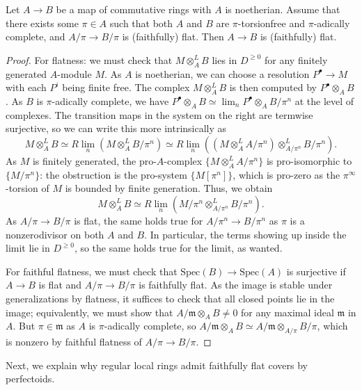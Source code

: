 \documentclass[10pt,reqno]{amsart}
\begin{document}
\begin{proposition}
\label{prop:FaithfulFlatnessNoetherian}
Let $A \to B$ be a map of commutative rings with $A$ is noetherian. Assume that there exists some  $\pi \in A$ such that both $A$ and $B$ are $\pi$-torsionfree and $\pi$-adically complete, and $A/\pi \to B/\pi$ is (faithfully) flat. Then $A \to B$ is (faithfully) flat.
\end{proposition}
\begin{proof}
For flatness: we must check that $M \otimes_A^L B$ lies in $D^{\geq 0}$ for any finitely generated $A$-module $M$. As $A$ is noetherian, we can choose a resolution $P^\bullet \to M$ with each $P^i$ being finite free. The complex $M \otimes_A^L B$ is then computed by $P^\bullet \otimes_A B$. As $B$ is $\pi$-adically complete, we have $P^\bullet \otimes_A B \simeq \lim_n P^\bullet \otimes_A B/\pi^n$ at the level of complexes. The transition maps in the system on the right are termwise surjective, so we can write this more intrinsically as
\[ M \otimes_A^L B \simeq R\lim_n (M \otimes_A^L B/\pi^n) \simeq R\lim_n ((M \otimes_A^L A/\pi^n) \otimes_{A/\pi^n}^L B/\pi^n).\]
As $M$ is finitely generated, the pro-$A$-complex $\{M \otimes_A^L A/\pi^n\}$ is pro-isomorphic to $\{M/\pi^n\}$: the obstruction is the pro-system $\{M[\pi^n]\}$, which is pro-zero as the $\pi^\infty$-torsion of $M$ is bounded by finite generation. Thus, we obtain
\[ M \otimes_A^L B \simeq R\lim_n (M/\pi^n \otimes_{A/\pi^n}^L B/\pi^n).\]
 As $A/\pi \to B/\pi$ is flat, the same holds true for $A/\pi^n \to B/\pi^n$ as $\pi$ is a nonzerodivisor on both $A$ and $B$. In particular, the terms showing up inside the limit lie in $D^{\geq 0}$, so the same holds true for the limit, as wanted.
 
 For faithful flatness, we must check that $\mathrm{Spec}(B) \to \mathrm{Spec}(A)$ is surjective if $A \to B$ is flat and $A/\pi \to B/\pi$ is faithfully flat. As the image is stable under generalizations by flatness, it suffices to check that all closed points lie in the image; equivalently, we must show that $A/\mathfrak{m} \otimes_A B \neq 0$ for any maximal ideal $\mathfrak{m}$ in $A$. But $\pi \in \mathfrak{m}$ as $A$ is $\pi$-adically complete, so $A/\mathfrak{m} \otimes_A B \simeq A/\mathfrak{m} \otimes_{A/\pi} B/\pi$, which is nonzero by faithful flatness of $A/\pi \to B/\pi$.
\end{proof}

Next, we explain why regular local rings admit faithfully flat covers by perfectoids. %
\end{document}
